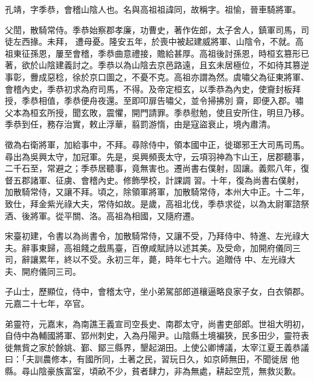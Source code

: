 
\begin{pinyinscope}

 孔靖，字季恭，會稽山陰人也。名與高祖祖諱同，故稱字。祖愉，晉車騎將軍。



 父誾，散騎常侍。季恭始察郡孝廉，功曹史，著作佐郎，太子舍人，鎮軍司馬，司徒左西掾。未拜，
 遭母憂。隆安五年，於喪中被起建威將軍、山陰令，不就。高祖東征孫恩，屢至會稽，季恭曲意禮接，贍給甚厚。高祖後討孫恩，時桓玄篡形已著，欲於山陰建義討之。季恭以為山陰去京邑路遠，且玄未居極位，不如待其篡逆事彰，釁成惡稔，徐於京口圖之，不憂不克。高祖亦謂為然。虞嘯父為征東將軍、會稽內史，季恭初求為府司馬，不得。及帝定桓玄，以季恭為內史，使齎封板拜授，季恭相值，季恭便舟夜還。至即叩扉告嘯父，並令掃拂別
 齋，即便入郡。嘯父本為桓玄所授，聞玄敗，震懼，開門請罪。季恭慰勉，使且安所住，明旦乃移。季恭到任，務存治實，敕止浮華，翦罰游惰，由是寇盜衰止，境內肅清。



 徵為右衛將軍，加給事中，不拜。尋除侍中，領本國中正，徙瑯邪王大司馬司馬。尋出為吳興太守，加冠軍。先是，吳興頻喪太守，云項羽神為卞山王，居郡聽事，二千石至，常避之；季恭居聽事，竟無害也。遷尚書右僕射，固讓。義熙八年，復督五郡諸軍、征虜、會稽內史。修飾學校，計課調
 習。十年，復為尚書右僕射，加散騎常侍，又讓不拜。頃之，除領軍將軍，加散騎常侍，本州大中正。十二年，致仕，拜金紫光祿大夫，常侍如故。是歲，高祖北伐，季恭求從，以為太尉軍諮祭酒、後將軍。從平關、洛。高祖為相國，又隨府遷。



 宋臺初建，令書以為尚書令，加散騎常侍，又讓不受，乃拜侍中、特進、左光祿大夫。辭事東歸，高祖餞之戲馬臺，百僚咸賦詩以述其美。及受命，加開府儀同三司，辭讓累年，終以不受。永初三年，薨，時年七十六。追贈侍
 中、左光祿大夫、開府儀同三司。



 子山士，歷顯位，侍中，會稽太守，坐小弟駕部郎道穰逼略良家子女，白衣領郡。元嘉二十七年，卒官。



 弟靈符，元嘉末，為南譙王義宣司空長史、南郡太守，尚書吏部郎。世祖大明初，自侍中為輔國將軍、郢州刺史，入為丹陽尹。山陰縣土境褊狹，民多田少，靈符表徙無貲之家於餘姚、鄞、鄮三縣界，墾起湖田。上使公卿博議，太宰江夏王義恭議曰：「夫訓農修本，有國所同，土著之民，習玩日久，如京師無田，不聞徙居
 他縣。尋山陰豪族富室，頃畝不少，貧者肆力，非為無處，耕起空荒，無救災歉。




\end{pinyinscope}
